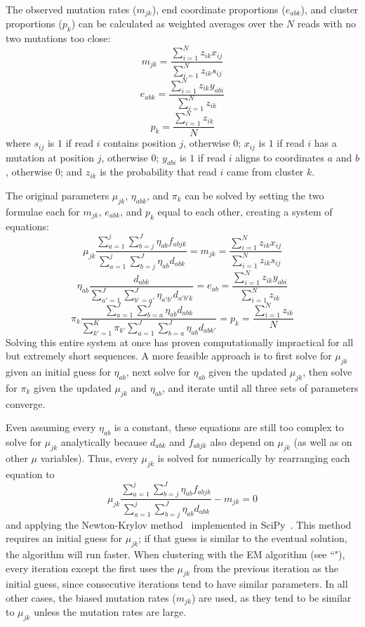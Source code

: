 \documentclass[11pt]{article}
\begin{document}
The observed mutation rates ($m_{jk}$), end coordinate proportions ($e_{abk}$), and cluster proportions ($p_k$) can be calculated as weighted averages over the $N$ reads with no two mutations too close:
$$m_{jk} = \frac{\sum_{i=1}^{N} z_{ik} x_{ij}}{\sum_{i=1}^{N} z_{ik} s_{ij}}$$
$$e_{abk} = \frac{\sum_{i=1}^{N} z_{ik} y_{abi}}{\sum_{i=1}^{N} z_{ik}}$$
$$p_k = \frac{\sum_{i=1}^{N} z_{ik}}{N}$$
where $s_{ij}$ is $1$ if read $i$ contains position $j$, otherwise $0$; $x_{ij}$ is $1$ if read $i$ has a mutation at position $j$, otherwise $0$; $y_{abi}$ is $1$ if read $i$ aligns to coordinates $a$ and $b$, otherwise $0$; and $z_{ik}$ is the probability that read $i$ came from cluster $k$.

The original parameters $\mu_{jk}$, $\eta_{abk}$, and $\pi_k$ can be solved by setting the two formulae each for $m_{jk}$, $e_{abk}$, and $p_k$ equal to each other, creating a system of equations:
$$\mu_{jk} \frac{\sum_{a=1}^{j}\sum_{b=j}^{J}\eta_{ab} f_{abjk}}{\sum_{a=1}^{j}\sum_{b=j}^{J}\eta_{ab}d_{abk}} = m_{jk} = \frac{\sum_{i=1}^{N} z_{ik} x_{ij}}{\sum_{i=1}^{N} z_{ik} s_{ij}}$$
$$\eta_{ab} \frac{d_{abk}}{\sum_{a'=1}^{J} \sum_{b'=a'}^{J} \eta_{a'b'} d_{a'b'k}} = e_{ab} = \frac{\sum_{i=1}^{N} z_{ik} y_{abi}}{\sum_{i=1}^{N} z_{ik}}$$
$$\pi_k \frac{\sum_{a=1}^{J} \sum_{b=a}^{J} \eta_{ab} d_{abk}}{\sum_{k'=1}^{K} \pi_{k'} \sum_{a=1}^{J} \sum_{b=a}^{J} \eta_{ab} d_{abk'}} = p_k = \frac{\sum_{i=1}^{N} z_{ik}}{N}$$
Solving this entire system at once has proven computationally impractical for all but extremely short sequences.
A more feasible approach is to first solve for $\mu_{jk}$ given an initial guess for $\eta_{ab}$, next solve for $\eta_{ab}$ given the updated $\mu_{jk}$, then solve for $\pi_k$ given the updated $\mu_{jk}$ and $\eta_{ab}$, and iterate until all three sets of parameters converge.

Even assuming every $\eta_{ab}$ is a constant, these equations are still too complex to solve for $\mu_{jk}$ analytically because $d_{abk}$ and $f_{abjk}$ also depend on $\mu_{jk}$ (as well as on other $\mu$ variables).
Thus, every $\mu_{jk}$ is solved for numerically by rearranging each equation to
$$\mu_{jk} \frac{\sum_{a=1}^{j}\sum_{b=j}^{J}\eta_{ab} f_{abjk}}{\sum_{a=1}^{j}\sum_{b=j}^{J}\eta_{ab}d_{abk}} - m_{jk} = 0$$
and applying the Newton-Krylov method~\cite{Knoll2004} implemented in SciPy~\cite{Virtanen2020}.
This method requires an initial guess for $\mu_{jk}$; if that guess is similar to the eventual solution, the algorithm will run faster.
When clustering with the EM algorithm (see ``"), every iteration except the first uses the $\mu_{jk}$ from the previous iteration as the initial guess, since consecutive iterations tend to have similar parameters.
In all other cases, the biased mutation rates ($m_{jk}$) are used, as they tend to be similar to $\mu_{jk}$ unless the mutation rates are large.
\end{document}
